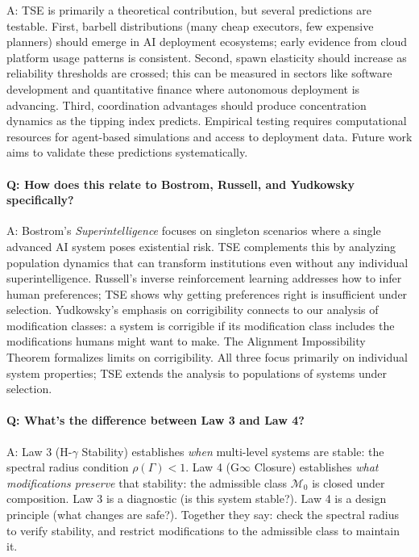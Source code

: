 \documentclass[12pt]{article}
\begin{document}
A: TSE is primarily a theoretical contribution, but several predictions are testable. First, barbell distributions (many cheap executors, few expensive planners) should emerge in AI deployment ecosystems; early evidence from cloud platform usage patterns is consistent. Second, spawn elasticity should increase as reliability thresholds are crossed; this can be measured in sectors like software development and quantitative finance where autonomous deployment is advancing. Third, coordination advantages should produce concentration dynamics as the tipping index predicts. Empirical testing requires computational resources for agent-based simulations and access to deployment data. Future work aims to validate these predictions systematically.

\paragraph{Q: How does this relate to Bostrom, Russell, and Yudkowsky specifically?}

A: Bostrom's \textit{Superintelligence} focuses on singleton scenarios where a single advanced AI system poses existential risk. TSE complements this by analyzing population dynamics that can transform institutions even without any individual superintelligence. Russell's inverse reinforcement learning addresses how to infer human preferences; TSE shows why getting preferences right is insufficient under selection. Yudkowsky's emphasis on corrigibility connects to our analysis of modification classes: a system is corrigible if its modification class includes the modifications humans might want to make. The Alignment Impossibility Theorem formalizes limits on corrigibility. All three focus primarily on individual system properties; TSE extends the analysis to populations of systems under selection.

\paragraph{Q: What's the difference between Law 3 and Law 4?}

A: Law 3 (H-$\gamma$ Stability) establishes \emph{when} multi-level systems are stable: the spectral radius condition $\rho(\Gamma) < 1$. Law 4 (G$\infty$ Closure) establishes \emph{what modifications preserve} that stability: the admissible class $\mathcal{M}_0$ is closed under composition. Law 3 is a diagnostic (is this system stable?). Law 4 is a design principle (what changes are safe?). Together they say: check the spectral radius to verify stability, and restrict modifications to the admissible class to maintain it.
\end{document}
